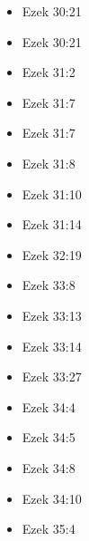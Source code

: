 \documentclass[14pt]{article}
\begin{document}
\begin{multicols}{2}
\begin{itemize}
														\item Ezek 30:21
														
														\item Ezek 30:21
														
														\item Ezek 31:2
														
														\item Ezek 31:7
														
														\item Ezek 31:7
														
														\item Ezek 31:8
														
														\item Ezek 31:10
														
														\item Ezek 31:14
														
														\item Ezek 32:19
														
														\item Ezek 33:8
														
														\item Ezek 33:13
														
														\item Ezek 33:14
														
														\item Ezek 33:27
														
														\item Ezek 34:4
														
														\item Ezek 34:5
														
														\item Ezek 34:8
														
														\item Ezek 34:10
														
														\item Ezek 35:4
														

\end{itemize}
\end{multicols}
\end{document}

